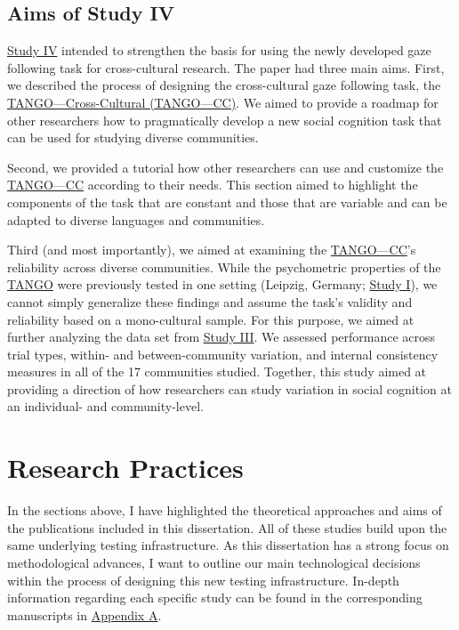 \documentclass[
]{scrbook}
\begin{document}
\subsection{Aims of Study IV}\label{aimsIV}

\hyperref[studyIV]{Study IV} intended to strengthen the basis for using the newly developed gaze following task for cross-cultural research. The paper had three main aims. First, we described the process of designing the cross-cultural gaze following task, the \hyperref[acronyms_TANGOux2014CC]{TANGO---Cross-Cultural (TANGO---CC)}. We aimed to provide a roadmap for other researchers how to pragmatically develop a new social cognition task that can be used for studying diverse communities.

Second, we provided a tutorial how other researchers can use and customize the \hyperref[acronyms_TANGOux2014CC]{TANGO---CC} according to their needs. This section aimed to highlight the components of the task that are constant and those that are variable and can be adapted to diverse languages and communities.

Third (and most importantly), we aimed at examining the \hyperref[acronyms_TANGOux2014CC]{TANGO---CC}'s reliability across diverse communities. While the psychometric properties of the \hyperref[acronyms_TANGO]{TANGO} were previously tested in one setting (Leipzig, Germany; \hyperref[studyI]{Study I}), we cannot simply generalize these findings and assume the task's validity and reliability based on a mono-cultural sample. For this purpose, we aimed at further analyzing the data set from \hyperref[studyIII]{Study III}. We assessed performance across trial types, within- and between-community variation, and internal consistency measures in all of the 17 communities studied. Together, this study aimed at providing a direction of how researchers can study variation in social cognition at an individual- and community-level.

\section{Research Practices}\label{researchpractices}

In the sections above, I have highlighted the theoretical approaches and aims of the publications included in this dissertation. All of these studies build upon the same underlying testing infrastructure. As this dissertation has a strong focus on methodological advances, I want to outline our main technological decisions within the process of designing this new testing infrastructure. In-depth information regarding each specific study can be found in the corresponding manuscripts in \hyperref[appendixA]{Appendix A}.
\end{document}
